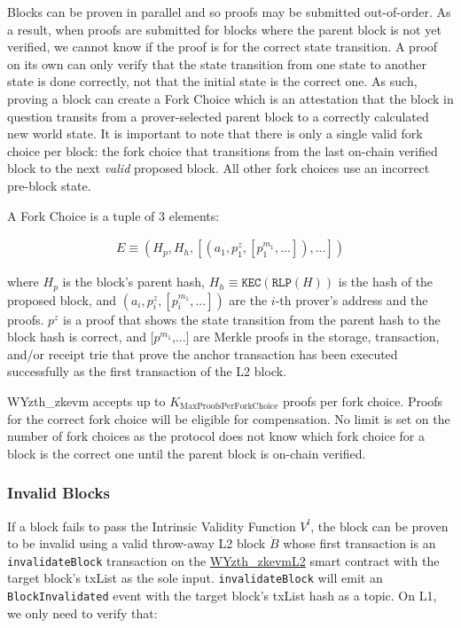 \documentclass[9pt,oneside]{amsart}
\begin{document}
\begin{multicols}{2}
Blocks can be proven in parallel and so proofs may be submitted out-of-order. As a result, when proofs are submitted for blocks where the parent block is not yet verified, we cannot know if the proof is for the correct state transition. A proof on its own can only verify that the state transition from one state to another state is done correctly, not that the initial state is the correct one. As such, proving a block can create a Fork Choice which is an attestation that the block in question transits from a prover-selected parent block to a correctly calculated new world state. It is important to note that there is only a single valid fork choice per block: the fork choice that transitions from the last on-chain verified block to the next \emph{valid} proposed block. All other fork choices use an incorrect pre-block state.

A Fork Choice is a tuple of 3 elements:

\begin{eqnarray}
E \equiv (H_p, H_h, [(a_1, p^{z}_1, [p^{m_1}_1,...]),...])
\end{eqnarray}

where $H_p$ is the block's parent hash, $H_h \equiv \texttt{KEC}(\texttt{RLP}(H))$ is the hash of the proposed block, and $(a_i, p^{z}_i, [p^{m_1}_i,...])$ are the $i$-th prover's address and the proofs. $p^{z}$ is a proof that shows the state transition from the parent hash to the block hash is correct, and [$p^{m_1}$,...] are Merkle proofs in the storage, transaction, and/or receipt trie that prove the anchor transaction has been executed successfully as the first transaction of the L2 block.

WYzth_zkevm accepts up to $K_{\mathrm{MaxProofsPerForkChoice}}$ proofs per fork choice. Proofs for the correct fork choice will be eligible for compensation. No limit is set on the number of fork choices as the protocol does not know which fork choice for a block is the correct one until the parent block is on-chain verified.

\subsubsection{Invalid Blocks} \label{sec:proving-invalid}

If a block fails to pass the Intrinsic Validity Function $V^l$, the block can be proven to be invalid using a valid throw-away L2 block $\dot{B}$ whose first transaction is an \texttt{invalidateBlock} transaction on the \underline{WYzth_zkevmL2} smart contract with the target block's txList as the sole input. \texttt{invalidateBlock} will emit an \texttt{BlockInvalidated} event with the target block's txList hash as a topic. On L1, we only need to verify that:


\end{multicols}
\end{document}

